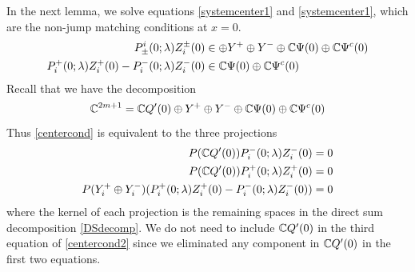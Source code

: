 \documentclass[10pt,reqno]{amsart}
\theoremstyle{plain}
\theoremstyle{definition}
\theoremstyle{remark}
\numberwithin{theorem}{section}
\numberwithin{equation}{section}
\begin{document}
In the next lemma, we solve equations \cref{systemcenter1} and \cref{systemcenter1}, which are the non-jump matching conditions at $x = 0$.
\begin{equation}\label{centercond}
\begin{aligned}
P^i_\pm(0; \lambda) Z_i^\pm(0) &\in \oplus Y^+ \oplus Y^- \oplus \mathbb{C} \Psi(0) \oplus \mathbb{C} \Psi^c(0) \\
P_i^+(0; \lambda) Z_i^+(0) - P_i^-(0; \lambda) Z_i^-(0) &\in \mathbb{C} \Psi(0) \oplus \mathbb{C} \Psi^c(0)
\end{aligned}
\end{equation}
Recall that we have the decomposition
\begin{equation}\label{DSdecomp}
\mathbb{C}^{2m+1} = \mathbb{C} Q'(0) \oplus Y^+ \oplus Y^- \oplus \mathbb{C} \Psi(0) \oplus \mathbb{C} \Psi^c(0)
\end{equation}
Thus \eqref{centercond} is equivalent to the three projections
\begin{equation}\label{centercond2}
\begin{aligned}
P(\mathbb{C} Q'(0) ) P_i^-(0; \lambda) Z_i^-(0) &= 0 \\
P(\mathbb{C} Q'(0) ) P_i^+(0; \lambda) Z_i^+(0) &= 0 \\
P(Y_i^+ \oplus Y_i^-) ( P_i^+(0; \lambda) Z_i^+(0) - P_i^-(0; \lambda) Z_i^-(0) ) &= 0
\end{aligned}
\end{equation}
where the kernel of each projection is the remaining spaces in the direct sum decomposition \eqref{DSdecomp}. We do not need to include $\mathbb{C} Q'(0)$ in the third equation of \eqref{centercond2} since we eliminated any component in $\mathbb{C} Q'(0)$ in the first two equations.
\end{document}
